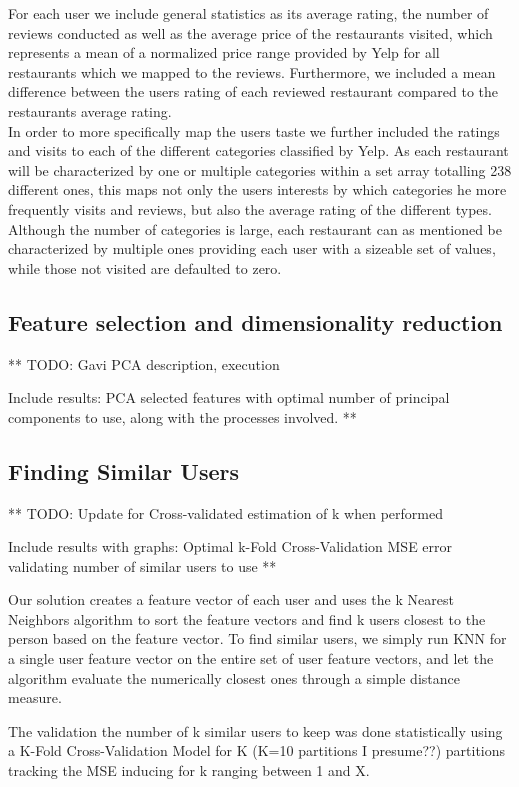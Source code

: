 \documentclass[10pt,twocolumn,letterpaper]{article}
\begin{document}
For each user we include general statistics as its average rating, the number of reviews conducted as well as the average price of the restaurants visited, which represents a mean of a normalized price range provided by Yelp for all restaurants which we mapped to the reviews. Furthermore, we included a mean difference between the users rating of each reviewed restaurant compared to the restaurants average rating. 
\\[.5em]
\indent In order to more specifically map the users taste we further included the ratings and visits to each of the different categories classified by Yelp. As each restaurant will be characterized by one or multiple categories within a set array totalling 238 different ones, this maps not only the users interests by which categories he more frequently visits and reviews, but also the average rating of the different types. Although the number of categories is large, each restaurant can as mentioned be characterized by multiple ones providing each user with a sizeable set of values, while those not visited are defaulted to zero.

\subsection{Feature selection and dimensionality reduction}
** 
TODO: Gavi PCA description, execution 

Include results: PCA selected features with optimal number of principal components to use, along with the processes involved.
**

\subsection{Finding Similar Users}
** 
TODO: Update for Cross-validated estimation of k when performed

Include results with graphs: Optimal k-Fold Cross-Validation MSE error validating number of similar users to use
**

Our solution creates a feature vector of each user and uses the k Nearest Neighbors algorithm to sort the feature vectors and find k users closest to the person based on the feature vector. To find similar users, we simply run KNN for a single user feature vector on the entire set of user feature vectors, and let the algorithm evaluate the numerically closest ones through a simple distance measure. 

The validation the number of k similar users to keep was done statistically using a K-Fold Cross-Validation Model for K (K=10 partitions I presume??) partitions tracking the MSE inducing for k ranging between 1 and X. 
\end{document}
